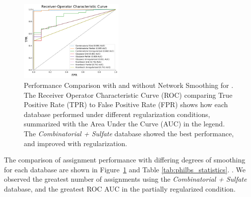    \begin{figure}[htb]
        \caption{Performance Comparison with and without Network Smoothing for \philbs
                 \label{fig:philbs_perf}. The Receiver Operator Characteristic Curve (ROC)
                 comparing True Positive Rate (TPR) to False Positive Rate (FPR) shows how
                 each database performed under different regularization conditions, summarized
                 with the Area Under the Curve (AUC) in the legend. The \textit{Combinatorial + Sulfate}
                 database showed the best performance, and improved with regularization.}
        \centering
        \includegraphics[width=0.45\textwidth,valign=t]{figure/sulfated_phil_bs_native_roc.pdf}
    \end{figure}

    The comparison of assignment performance with differing degrees of smoothing for each database
    are shown in Figure~\ref{fig:philbs_perf} and Table \ref{tab:philbs_statistics}. . We observed the greatest number of
    assignments using the \textit{Combinatorial + Sulfate} database, and the greatest ROC AUC in
    the partially regularized condition.

